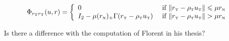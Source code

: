 \begin{equation}
  \label{eq:Phi-CKPS-II-rtrt}
  \Phi_{r_\t r_\t}(u,r) =
  \left\{
    \begin{array}{ll}
      0 & \text{ if }  \|r_{\t}  - \rho_{\t} u_{\t}\| \leq  \mu r_{\n}\\
      I_2-\mu (r_{\n})_+ \Gamma(r_{\t} - \rho_{\t} u_{\t})    &  \text{ if }
        \|r_{\t}  - \rho_{\t} u_{\t}\| >  \mu r_{\n}  \\
    \end{array}\right.
\end{equation}

\begin{ndrva}
  \begin{list}{*}{}
  \item     Is    there    a    difference    with    the    computation    of    Florent    in    his    thesis?
  \item
  \end{list}
\end{ndrva}



